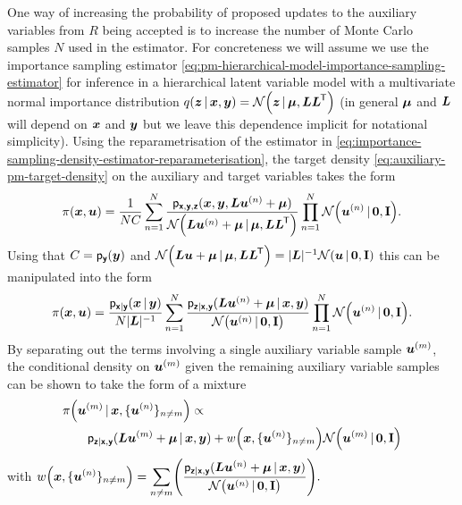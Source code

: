 One way of increasing the probability of proposed updates to the auxiliary variables from $R$ being accepted is to increase the number of Monte Carlo samples $N$ used in the estimator. For concreteness we will assume we use the importance sampling estimator \eqref{eq:pm-hierarchical-model-importance-sampling-estimator} for inference in a hierarchical latent variable model with a multivariate normal importance distribution $q(\vct{z}\gvn\vct{x},\vct{y}) = \nrm{\vct{z}\gvn\vct{\mu},\mtx{L}\mtx{L}\tr}$ (in general $\boldsymbol{\mu}$ and $\boldsymbol{L}$ will depend on $\boldsymbol{x}$ and $\boldsymbol{y}$ but we leave this dependence implicit for notational simplicity). Using the reparametrisation of the estimator in \eqref{eq:importance-sampling-density-estimator-reparameterisation}, the target density \eqref{eq:auxiliary-pm-target-density} on the auxiliary and target variables takes the form
\begin{equation}
  \pi(\vct{x},\vct{u}) = \frac{1}{NC} 
  \sum_{n=1}^N \frac{\pden{\rvct{x},\rvct{y},\rvct{z}}(\vct{x},\vct{y},\mtx{L}\vct{u}^{(n)} + \vct{\mu})}{\nrm{\mtx{L}\vct{u}^{(n)} + \vct{\mu} \gvn \vct{\mu},\mtx{L}\mtx{L}\tr}}
  \prod_{n=1}^N \nrm{\vct{u}^{(n)} \gvn \vct{0},\mathbf{I}}.
\end{equation}
Using that $C = \mathsf{p}_{\boldsymbol{\mathsf{y}}}(\boldsymbol{y})$ and $\nrm{\mtx{L}\vct{u} + \vct{\mu} \gvn \vct{\mu},\mtx{L}\mtx{L}\tr} = |\mtx{L}|^{-1} \nrm{\vct{u} \gvn \vct{0},\mathbf{I}}$ this can be manipulated into the form
\begin{equation*}
  \pi(\vct{x},\vct{u}) = \frac{\pden{\rvct{x}|\rvct{y}}(\vct{x}\gvn\vct{y})}{N|\mtx{L}|^{-1}} 
  \sum_{n=1}^N \frac{\pden{\rvct{z}|\rvct{x},\rvct{y}}(\mtx{L}\vct{u}^{(n)} + \vct{\mu}\gvn \vct{x},\vct{y})}{\nrm{\vct{u}^{(n)} \gvn \vct{0},\mathbf{I}}}
  \prod_{n=1}^N \nrm{\vct{u}^{(n)} \gvn \vct{0},\mathbf{I}}.
\end{equation*}
By separating out the terms involving a single auxiliary variable sample $\boldsymbol{u}^{(m)}$, the conditional density on $\boldsymbol{u}^{(m)}$ given the remaining auxiliary variable samples can be shown to take the form of a mixture
\begin{equation}
\begin{split}
  &\pi\lpa\vct{u}^{(m)} \gvn \vct{x},\lbrace \vct{u}^{(n)} \rbrace_{n\neq m} \rpa \propto \\
  &\qquad  
  \pden{\rvct{z}|\rvct{x},\rvct{y}}(\mtx{L}\vct{u}^{(m)} + \vct{\mu} \gvn \vct{x},\vct{y}) +
  w\lpa\vct{x},\lbrace \vct{u}^{(n)} \rbrace_{n\neq m}\rpa \nrm{\vct{u}^{(m)}\gvn \vct{0},\mathbf{I}}
\end{split}
\end{equation}
with \(\displaystyle
  w\lpa\vct{x},\lbrace \vct{u}^{(n)} \rbrace_{n\neq m}\rpa =
  \sum_{n\neq m}\lpa 
  \frac
    {\pden{\rvct{z}|\rvct{x},\rvct{y}}(\mtx{L}\vct{u}^{(n)} + \vct{\mu} \gvn \vct{x},\vct{y})}
    {\nrm{\vct{u}^{(n)}\gvn \vct{0},\mathbf{I}}}  
  \rpa.\)

